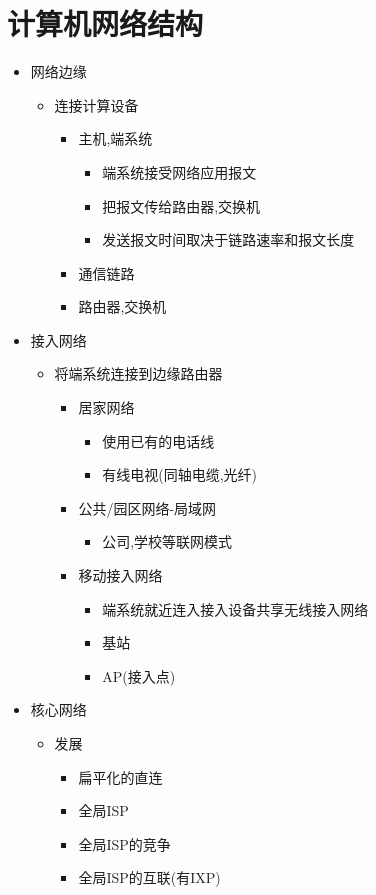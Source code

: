 \documentclass[a4paper,12pt,notitlepage]{article}
\begin{document}
\section{计算机网络结构}
\begin{itemize}
	\item 网络边缘
	\begin{itemize}
		\item 连接计算设备
		\begin{itemize}
			\item 主机,端系统
			\begin{itemize}
				\item 端系统接受网络应用报文
				\item 把报文传给路由器,交换机
				\item 发送报文时间取决于链路速率和报文长度
			\end{itemize}
			\item 通信链路
			\item 路由器,交换机
		\end{itemize}
	\end{itemize}
	\item 接入网络
	\begin{itemize}
		\item 将端系统连接到边缘路由器
		\begin{itemize}
			\item 居家网络
			\begin{itemize}
				\item 使用已有的电话线
				\item 有线电视(同轴电缆,光纤)
			\end{itemize}
			\item 公共/园区网络-局域网
			\begin{itemize}
				\item 公司,学校等联网模式
			\end{itemize}
			\item 移动接入网络
			\begin{itemize}
				\item 端系统就近连入接入设备共享无线接入网络
				\item 基站
				\item AP(接入点)
			\end{itemize}
		\end{itemize}
	\end{itemize}
	\item 核心网络
	\begin{itemize}
		\item 发展
		\begin{itemize}
			\item 扁平化的直连
			\item 全局ISP
			\item 全局ISP的竞争
			\item 全局ISP的互联(有IXP)
		\end{itemize}
	\end{itemize}
\end{itemize}
\end{document}
